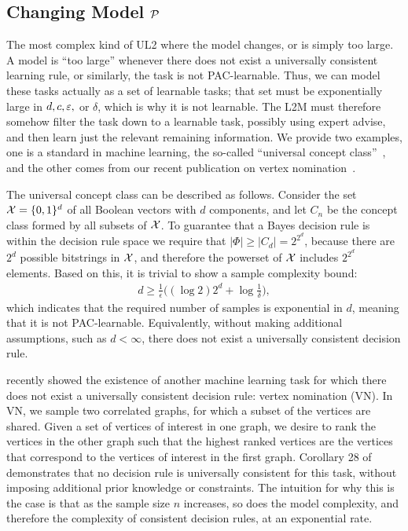 \documentclass{article}
\begin{document}
\subsection{Changing Model $\mathcal{P}$}

The most complex kind of UL2 where the model changes, or is simply too large. A model is ``too large'' whenever there does not exist a universally consistent learning rule, or similarly, the task is not PAC-learnable. Thus, we can model these tasks actually as a set of learnable tasks;  that set must be exponentially large in $d,c,\varepsilon,$ or $\delta$, which is why it is not learnable.  The L2M must therefore somehow filter the task down to a learnable task, possibly using expert advise, and then learn just the relevant remaining information.  We provide two examples, one is a standard in machine learning, the so-called ``universal concept class''~\cite{Mohri2012}, and the other comes from our recent publication on vertex nomination~\cite{Lyzinski2017}.  

The universal concept class can be described as follows.  Consider the set $\mathcal{X}=\{0,1\}^d$ of all Boolean vectors with $d$ components, and let $C_n$ be the concept class formed by all subsets of $\mathcal{X}$.  To guarantee that a Bayes decision rule is within the decision rule space we require that $|\Phi| \geq |C_d| = 2^{2^d}$, because there are $2^d$ possible bitstrings in $\mathcal{X}$, and therefore the powerset of $\mathcal{X}$ includes $2^{2^d}$ elements.  Based on this, it is trivial to show a sample complexity bound:
\begin{align}
    d \geq \frac{1}{\epsilon} \big(  (\log 2) 2^d + \log \frac{1}{\delta} \big),
\end{align}
which indicates that the required number of samples is exponential in $d$, meaning that it is not PAC-learnable.  Equivalently, without making additional assumptions, such as $d < \infty$, there does not exist a universally consistent decision rule. 

\citet{Lyzinski2017} recently showed the existence of another machine learning task for which there does not exist a universally consistent decision rule: vertex nomination (VN).  In VN, we sample two correlated graphs, for which a subset of the vertices are shared.  Given a set of vertices of interest in one graph, we desire to rank the vertices in the other graph such that the highest ranked vertices are the vertices that correspond to the vertices of interest in the first graph.  Corollary 28 of~\citet{Lyzinski2017} demonstrates that no decision rule is universally consistent for this task, without imposing additional prior knowledge or constraints.   The intuition for why this is the case is that as the sample size $n$ increases, so does the model complexity, and therefore the complexity of consistent decision rules, at an exponential rate.
\end{document}

